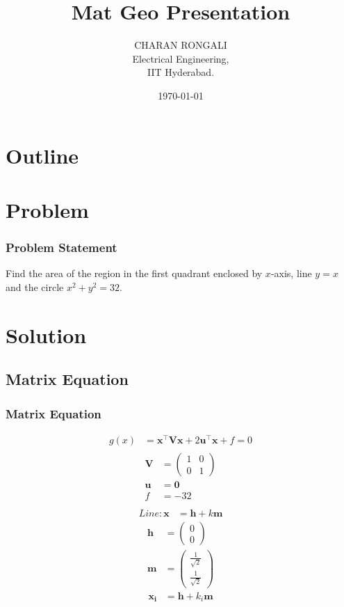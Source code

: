 \documentclass{beamer}
\title{Mat Geo Presentation}
\author{CHARAN RONGALI \\ Electrical Engineering,\\IIT Hyderabad.}
\date{\today}
\theoremstyle{remark}
\newcommand{\myvec}[1]{\ensuremath{\begin{pmatrix}#1\end{pmatrix}}}
\let\vec\mathbf
\numberwithin{equation}{section}
\begin{document}
\begin{frame}
\titlepage
\end{frame}

\section*{Outline}
\begin{frame}
\tableofcontents
\end{frame}
\section{Problem}
\begin{frame}
\frametitle{Problem Statement}
Find the area of the region in the first quadrant enclosed by $x$-axis, line $y=x$ and the circle $x^2 + y^2 = 32$.

\end{frame}

\section{Solution}
\subsection{Matrix Equation}
\begin{frame}
\frametitle{Matrix Equation}
\begin{align}
\label{eq:equation}
g(x) &= \vec{x}^\top \vec{V}\vec{x}+2\vec{u}^\top \vec{x}+f=0
\end{align}
\begin{align}
\begin{split}
\vec{V} &= \myvec{1 & 0
                 \\
		 0 & 1}\\
	\vec{u} &= \vec{0} \\
	f &= -32\\
\end{split}
\end{align}
\begin{align}
Line: \vec{x} &= \vec{h}+k\vec{m} 
\end{align}
\begin{align}
	\vec{h} &= \myvec{0 \\ 0} \\
	\vec{m} &= \myvec{\frac{1}{\sqrt{2}} \\ \frac{1}{\sqrt{2}}}
\end{align}
\begin{align}
\label{eq:points}
	\vec{x_i} &= \vec{h}+k_{i}\vec{m}
\end{align}
\end{frame}
\end{document}
